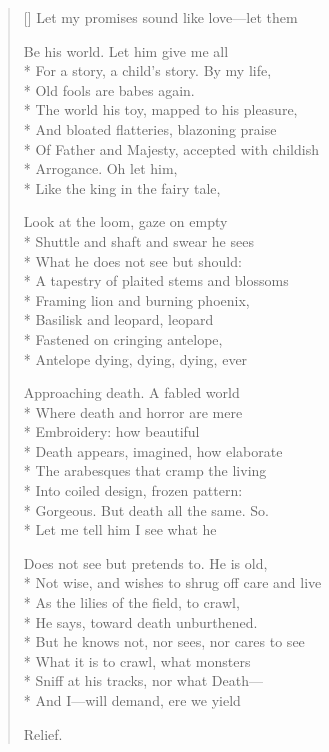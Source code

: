 \label{ch:lear_ad}
\settowidth{\versewidth}{Not wise, and wishes to shrug off care and live}
\begin{verse}[\versewidth]
 Let my promises sound like love---let them

Be his world.  Let him give me all\\*
For a story, a child's story.    By my life,\\*
Old fools are babes again.\\*
The world his toy, mapped to his pleasure,\\*
And bloated flatteries, blazoning praise\\*
Of Father and Majesty, accepted with childish\\*
Arrogance.  Oh let him,\\*
Like the king in the fairy tale,

Look at the loom, gaze on empty\\*
Shuttle and shaft and swear he sees\\*
What he does not see but should:\\*
A tapestry of plaited stems and blossoms\\*
Framing lion and burning phoenix,\\*
Basilisk and leopard, leopard\\*
Fastened on cringing antelope,\\*
Antelope dying, dying, dying, ever

Approaching death.    A fabled world\\*
Where death and horror are mere\\*
Embroidery: how beautiful\\*
Death appears, imagined, how elaborate\\*
The arabesques that cramp the living\\*
Into coiled design, frozen pattern:\\*
Gorgeous. But death all the same. So.\\*
Let me tell him I see what he

Does not see but pretends to.  He is old,\\*
Not wise, and wishes to shrug off care and live\\*
As the lilies of the field, to crawl,\\*
He says, toward death unburthened.\\*
But he knows not, nor sees, nor cares to see\\*
What it is to crawl, what monsters\\*
Sniff at his tracks, nor what Death---\\*
And I---will demand, ere we yield

Relief.
\end{verse}

